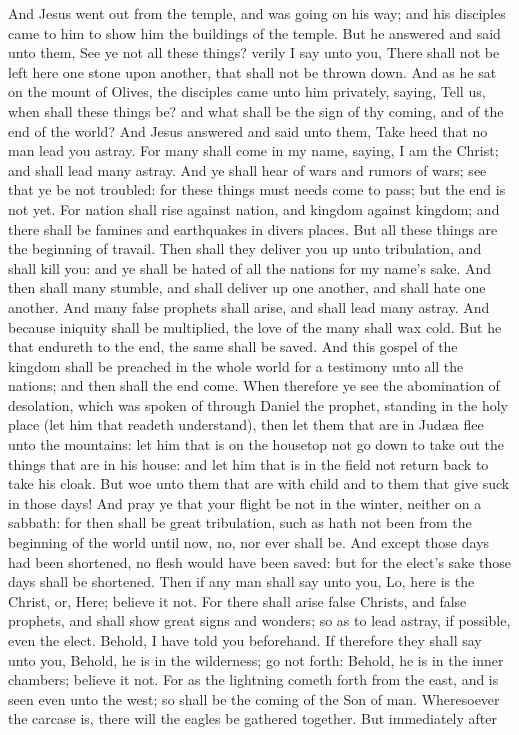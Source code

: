 And Jesus went out from the temple, and was going on his way; and his disciples came to him to show him the buildings of the temple. But he answered and said unto them, See ye not all these things? verily I say unto you, There shall not be left here one stone upon another, that shall not be thrown down.  And as he sat on the mount of Olives, the disciples came unto him privately, saying, Tell us, when shall these things be? and what shall be the sign of thy coming, and of the end of the world? And Jesus answered and said unto them, Take heed that no man lead you astray. For many shall come in my name, saying, I am the Christ; and shall lead many astray. And ye shall hear of wars and rumors of wars; see that ye be not troubled: for these things must needs come to pass; but the end is not yet. For nation shall rise against nation, and kingdom against kingdom; and there shall be famines and earthquakes in divers places. But all these things are the beginning of travail. Then shall they deliver you up unto tribulation, and shall kill you: and ye shall be hated of all the nations for my name’s sake. And then shall many stumble, and shall deliver up one another, and shall hate one another. And many false prophets shall arise, and shall lead many astray. And because iniquity shall be multiplied, the love of the many shall wax cold. But he that endureth to the end, the same shall be saved. And this gospel of the kingdom shall be preached in the whole world for a testimony unto all the nations; and then shall the end come.  When therefore ye see the abomination of desolation, which was spoken of through Daniel the prophet, standing in the holy place (let him that readeth understand), then let them that are in Judæa flee unto the mountains: let him that is on the housetop not go down to take out the things that are in his house: and let him that is in the field not return back to take his cloak. But woe unto them that are with child and to them that give suck in those days! And pray ye that your flight be not in the winter, neither on a sabbath: for then shall be great tribulation, such as hath not been from the beginning of the world until now, no, nor ever shall be. And except those days had been shortened, no flesh would have been saved: but for the elect’s sake those days shall be shortened. Then if any man shall say unto you, Lo, here is the Christ, or, Here; believe it not. For there shall arise false Christs, and false prophets, and shall show great signs and wonders; so as to lead astray, if possible, even the elect. Behold, I have told you beforehand. If therefore they shall say unto you, Behold, he is in the wilderness; go not forth: Behold, he is in the inner chambers; believe it not. For as the lightning cometh forth from the east, and is seen even unto the west; so shall be the coming of the Son of man. Wheresoever the carcase is, there will the eagles be gathered together.  But immediately after 